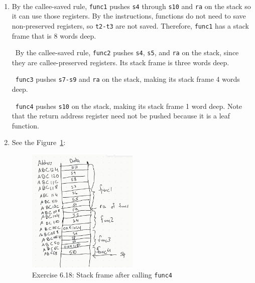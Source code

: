 \documentclass[12pt]{article}
\newenvironment{sol}[1][Solution]{\begin{trivlist}
		\item[\hskip \labelsep {\bfseries #1:}]}{\end{trivlist}}
\begin{document}
\begin{sol}
	\
	\begin{enumerate}[label=(\alph*)]
		\item By the callee-saved rule, \texttt{func1} pushes \texttt{s4}
			through \texttt{s10} and \texttt{ra} on the stack so it can use those registers. By the instructions, functions do not need to save non-preserved
			registers, so \texttt{t2-t3} are not saved. Therefore, \texttt{func1}
			has a stack frame that is 8 words deep.
			
			\
			By the callee-saved rule, \texttt{func2} pushes \texttt{s4},
			\texttt{s5}, and \texttt{ra} on the stack, since they are
			callee-preserved registers. Its stack frame is three words deep.
			
			\
			\texttt{func3} pushes  \texttt{s7-s9} and \texttt{ra} on the stack,
			making its stack frame 4 words deep.
			
			\
			\texttt{func4} pushes \texttt{s10} on the stack, making its
			stack frame 1 word deep. Note that the return address register need
			not be pushed because it is a leaf function.
		\item See the Figure~\ref{ex:6-18}:
		\begin{figure}
			\centering
			\includegraphics[width=0.5\textwidth]{exercise-6-18-stack-frame}
			\caption{Exercise 6.18: Stack frame after calling \texttt{func4}}
			\label{ex:6-18}
		\end{figure}
	\end{enumerate}
\end{sol}
\end{document}

